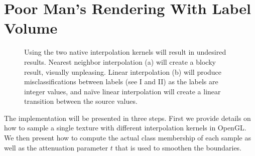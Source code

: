 \documentclass{egpubl}
\begin{document}
\section{Poor Man's Rendering With Label Volume}
\begin{figure}
	\centering
	\caption{Using the two native interpolation kernels will result in undesired results. Nearest neighbor interpolation (a) will create a blocky result, visually unpleasing. Linear interpolation (b) will produce misclassifications between labels (see I and II) as the labels are integer values, and na\"ive linear interpolation will create a linear transition between the source values.}
\end{figure}


The implementation will be presented in three steps. First we provide details on how to sample a single texture with different interpolation kernels in OpenGL. We then present how to compute the actual class membership of each sample as well as the attenuation parameter $t$ that is used to smoothen the boundaries. 
\end{document}
